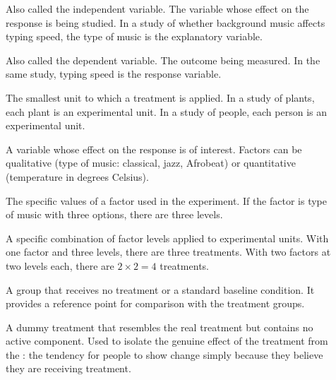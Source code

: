 \begin{description}
    \item[] Also called the independent variable. The variable 
    whose effect on the response is being studied. In a study of whether background music affects typing speed, the type of music is the explanatory variable.

    \item[] Also called the dependent variable. The outcome being measured. 
    In the same study, typing speed is the response variable.

    \item[] The smallest unit to which a treatment is applied. In a study of 
    plants, each plant is an experimental unit. In a study of people, each person is an experimental unit.

    \item[] A variable whose effect on the response is of interest. Factors can be qualitative 
    (type of music: classical, jazz, Afrobeat) or quantitative (temperature in degrees Celsius).

    \item[] The specific values of a factor used in the experiment. If the factor is type of music 
    with three options, there are three levels.

    \item[] A specific combination of factor levels applied to experimental units. With one 
    factor and three levels, there are three treatments. With two factors at two levels each, there are $2 \times 2 = 4$ treatments.

    \item[] A group that receives no treatment or a standard baseline condition. 
    It provides a reference point for comparison with the treatment groups.

    \item[] A dummy treatment that resembles the real treatment but contains no active component. 
    Used to isolate the genuine effect of the treatment from the : the tendency for 
    people to show change simply because they believe they are receiving treatment.
\end{description}

